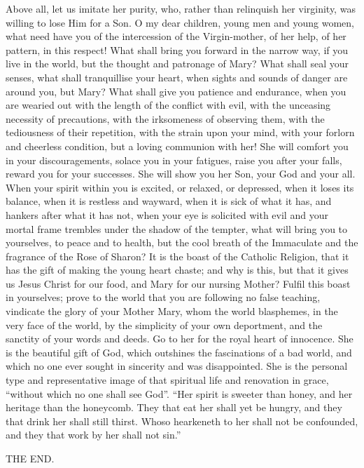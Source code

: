 Above all, let us imitate her purity, who, rather than relinquish
her virginity, was willing to lose Him for a Son. O my dear children,
young men and young women, what need have you of the intercession of
the Virgin-mother, of her help, of her pattern, in this respect! What
shall bring you forward in the narrow way, if you live in the world,
but the thought and patronage of Mary? What shall seal your senses,
what shall tranquillise your heart, when sights and sounds of danger
are around you, but Mary? What shall give you patience and endurance,
when you are wearied out with the length of the conflict with evil,
with the unceasing necessity of precautions, with the irksomeness of
observing them, with the tediousness of their repetition, with the
strain upon your mind, with your forlorn and cheerless condition, but
a loving communion with her! She will comfort you in your
discouragements, solace you in your fatigues, raise you after your
falls, reward you for your successes. She will show you her Son, your
God and your all. When your spirit within you is excited, or relaxed,
or depressed, when it loses its balance, when it is restless and
wayward, when it is sick of what it has, and hankers after what it has
not, when your eye is solicited with evil and your mortal frame
trembles under the shadow of the tempter, what will bring you to
yourselves, to peace and to health, but the cool breath of the
Immaculate and the fragrance of the Rose of Sharon? It is the boast of
the Catholic Religion, that it has the gift of making the young heart
chaste; and why is this, but that it gives us Jesus Christ for our
food, and Mary for our nursing Mother? Fulfil this boast in
yourselves; prove to the world that you are following no false
teaching, vindicate the glory of your Mother Mary, whom the world
blasphemes, in the very face of the world, by the simplicity of your
own deportment, and the sanctity of your words and deeds. Go to her
for the royal heart of innocence. She is the beautiful gift of God,
which outshines the fascinations of a bad world, and which no one ever
sought in sincerity and was disappointed. She is the personal type and
representative image of that spiritual life and renovation in grace,
``without which no one shall see God''. ``Her spirit is
sweeter than honey, and her heritage than the honeycomb. They that eat
her shall yet be hungry, and they that drink her shall still thirst.
Whoso hearkeneth to her shall not be confounded, and they that work by
her shall not sin.''

THE END.
